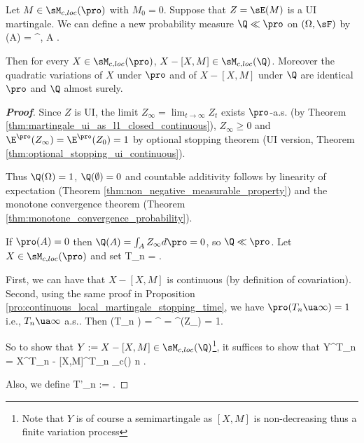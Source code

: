 \begin{theorem}\label{thm:girsanov}
Let $M \in \sM_{c,loc}(\pro)$ with $M_0 = 0$. Suppose that $Z = \sE(M)$ is a UI martingale. We can define a new probability measure $\Q \ll \pro$ on $(\Omega,\sF)$ by
\be
\Q(A) = \E^{\pro}, \quad A \in \sF.
\ee

Then for every $X \in \sM_{c,loc}(\pro)$, $X - [X,M] \in \sM_{c,loc}(\Q)$. Moreover the quadratic variations of $X$ under $\pro$ and of $X - [X,M]$ under $\Q$ are identical $\pro$ and $\Q$ almost surely.
\end{theorem}

\begin{proof}[\bf Proof]
Since $Z$ is UI, the limit $Z_\infty = \lim_{t\to\infty} Z_t$ exists $\pro$-a.s. (by Theorem \ref{thm:martingale_ui_as_l1_closed_continuous}),
$Z_\infty \geq 0$ and $\E^{\pro}(Z_\infty) = \E^{\pro}(Z_0) = 1$ by optional stopping theorem (UI version, Theorem \ref{thm:optional_stopping_ui_continuous}).

Thus $\Q(\Omega) = 1$, $\Q(\emptyset) = 0$ and countable additivity follows by linearity of expectation (Theorem \ref{thm:non_negative_measurable_property}) and the monotone convergence theorem (Theorem \ref{thm:monotone_convergence_probability}).

If $\pro(A) = 0$ then $\Q(A) = \int_A Z_\infty d\pro = 0$, so $\Q \ll \pro$. Let $X \in \sM_{c,loc}(\pro)$ and set
\be
T_n = \inf{}.
\ee

First, we can have that $X - [X,M]$ is continuous (by definition of covariation). Second, using the same proof in Proposition \ref{pro:continuous_local_martingale_stopping_time},
we have $\pro(T_n \ua\infty) = 1$ i.e., $T_n\ua \infty$ a.s.. Then
\be
\Q(T_n \ua\infty) = \E^{\pro} = \E^{\pro}(Z_\infty) = 1.
\ee

So to show that $Y := X - [X,M] \in \sM_{c,loc}(\Q)$\footnote{Note that $Y$ is of course a semimartingale as $[X,M]$ is non-decreasing thus a finite variation process}, it suffices to show that
\be
Y^{T_n} = X^{T_n} - [X,M]^{T_n} \in \sM_c(\Q) \quad {}n \in \N.
\ee

Also, we define
\beast%
T'_n := \inf{} \quad {}.
\eeast


\end{proof}
